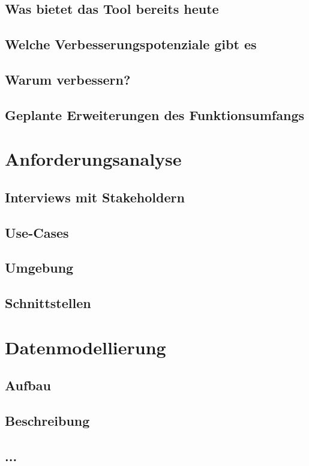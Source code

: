 \documentclass[12pt, titlepage]{article}
\begin{document}
\subsection{Was bietet das Tool bereits heute}
\subsection{Welche Verbesserungspotenziale gibt es}
\subsection{Warum verbessern?}
\subsection{Geplante Erweiterungen des Funktionsumfangs}

\newpage
\section{Anforderungsanalyse}
\subsection{Interviews mit Stakeholdern}
\subsection{Use-Cases}
\subsection{Umgebung}
\subsection{Schnittstellen}

\newpage
\section{Datenmodellierung}
\subsection{Aufbau}
\subsection{Beschreibung }
\subsection{...}
\end{document}
